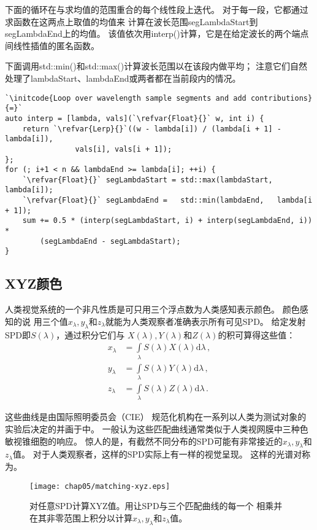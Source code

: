下面的循环在与求均值的范围重合的每个线性段上迭代。
对于每一段，它都通过求函数在这两点上取值的均值来
计算在波长范围{\ttfamily segLambdaStart}到{\ttfamily segLambdaEnd}上的均值。
该值依次用{\ttfamily interp()}计算，它是在给定波长的两个端点间线性插值的匿名函数。

下面调用{\ttfamily std::min()}和{\ttfamily std::max()}计算波长范围以在该段内做平均；
注意它们自然处理了{\ttfamily lambdaStart}、{\ttfamily lambdaEnd}或两者都在当前段内的情况。
\begin{lstlisting}
`\initcode{Loop over wavelength sample segments and add contributions}{=}`
auto interp = [lambda, vals](`\refvar{Float}{}` w, int i) {
    return `\refvar{Lerp}{}`((w - lambda[i]) / (lambda[i + 1] - lambda[i]),
                vals[i], vals[i + 1]);
};
for (; i+1 < n && lambdaEnd >= lambda[i]; ++i) {
    `\refvar{Float}{}` segLambdaStart = std::max(lambdaStart, lambda[i]);
    `\refvar{Float}{}` segLambdaEnd =   std::min(lambdaEnd,   lambda[i + 1]);
    sum += 0.5 * (interp(segLambdaStart, i) + interp(segLambdaEnd, i)) *
        (segLambdaEnd - segLambdaStart);
}
\end{lstlisting}

\subsection{XYZ颜色}\label{sub:XYZ颜色}
人类视觉系统的一个非凡性质是可只用三个浮点数为人类感知表示颜色。
颜色感知的说
用三个值$x_{\lambda},y_{\lambda}$和$z_{\lambda}$就能为人类观察者准确表示所有可见SPD。
给定发射SPD即$S(\lambda)$，通过积分它们与
$X(\lambda),Y(\lambda)$和$Z(\lambda)$的积可算得这些值：
\begin{align}\label{eq:5.1}
    x_{\lambda} & =\int\limits_{\lambda}{S(\lambda)X(\lambda)\mathrm{d}\lambda}\, ,\nonumber \\
    y_{\lambda} & =\int\limits_{\lambda}{S(\lambda)Y(\lambda)\mathrm{d}\lambda}\, ,          \\
    z_{\lambda} & =\int\limits_{\lambda}{S(\lambda)Z(\lambda)\mathrm{d}\lambda}\, .\nonumber
\end{align}

这些曲线是由国际照明委员会（CIE）
规范化机构在一系列以人类为测试对象的实验后决定的并画于中。
一般认为这些匹配曲线通常类似于人类视网膜中三种色敏视锥细胞的响应。
惊人的是，有截然不同分布的SPD可能有非常接近的$x_{\lambda},y_{\lambda}$和$z_{\lambda}$值。
对于人类观察者，这样的SPD实际上有一样的视觉呈现。
这样的光谱对称为。
\begin{figure}[htbp]
    \centering\texttt{[image: chap05/matching-xyz.eps]}
    \caption{对任意SPD计算XYZ值。用让SPD与三个匹配曲线的每一个
    相乘并在其非零范围上积分以计算$x_{\lambda},y_{\lambda}$和$z_{\lambda}$值。}
    \label{fig:5.3}
\end{figure}

